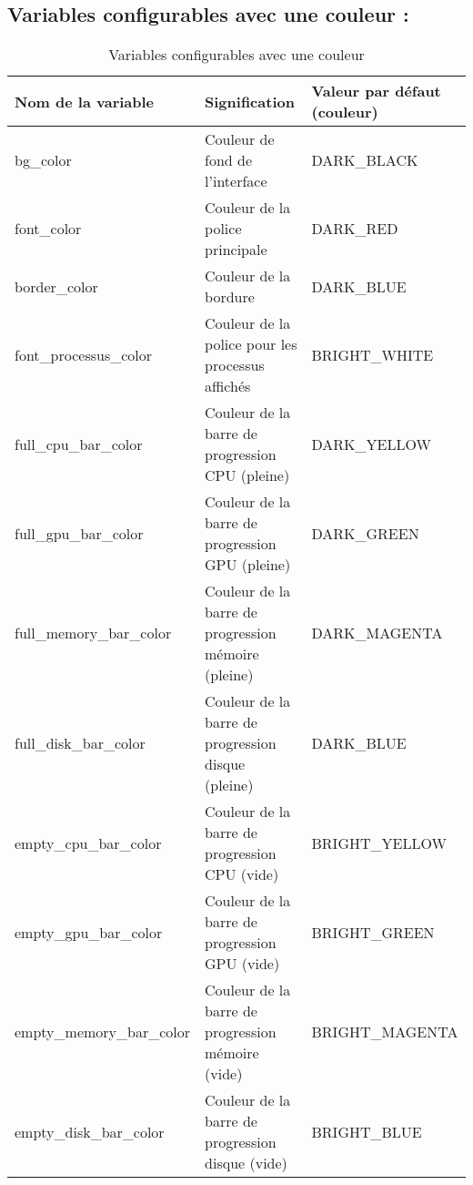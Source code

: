 \documentclass{article}
\begin{document}
\subsection{Variables configurables avec une couleur :}

\begin{table}[h!]
    \centering
    \renewcommand{\arraystretch}{1.5}
    \footnotesize
    \begin{tabular}{|>{\centering\arraybackslash}m{3.5cm}|>{\centering\arraybackslash}m{3.8cm}|>{\centering\arraybackslash}m{3cm}|}
        \hline
        \textbf{Nom de la variable} & \textbf{Signification} & \textbf{Valeur par défaut (couleur)} \\
        \hline
        bg\_color & Couleur de fond de l'interface & DARK\_BLACK \\
        \hline
        font\_color & Couleur de la police principale & DARK\_RED \\
        \hline
        border\_color & Couleur de la bordure & DARK\_BLUE \\
        \hline
        font\_processus\_color & Couleur de la police pour les processus affichés & BRIGHT\_WHITE \\
        \hline
        full\_cpu\_bar\_color & Couleur de la barre de progression CPU (pleine) & DARK\_YELLOW \\
        \hline
        full\_gpu\_bar\_color & Couleur de la barre de progression GPU (pleine) & DARK\_GREEN \\
        \hline
        full\_memory\_bar\_color & Couleur de la barre de progression mémoire (pleine) & DARK\_MAGENTA \\
        \hline
        full\_disk\_bar\_color & Couleur de la barre de progression disque (pleine) & DARK\_BLUE \\
        \hline
        empty\_cpu\_bar\_color & Couleur de la barre de progression CPU (vide) & BRIGHT\_YELLOW \\
        \hline
        empty\_gpu\_bar\_color & Couleur de la barre de progression GPU (vide) & BRIGHT\_GREEN \\
        \hline
        empty\_memory\_bar\_color & Couleur de la barre de progression mémoire (vide) & BRIGHT\_MAGENTA \\
        \hline
        empty\_disk\_bar\_color & Couleur de la barre de progression disque (vide) & BRIGHT\_BLUE \\
        \hline
    \end{tabular}
    \label{tab:configable_color_var}
    \caption{Variables configurables avec une couleur}
\end{table}
\end{document}
